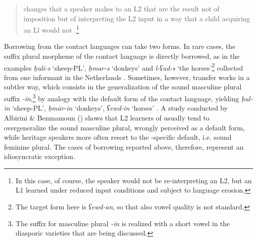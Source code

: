 \documentclass[output=paper]{langsci/langscibook}
\begin{document}
\begin{quote}changes that a speaker makes to an L2 that are the result not of {imposition} but of interpreting the L2 input in a way that a child acquiring an Ll would not \citep[525]{Lucas2015}.\footnote{In this case, of course, the speaker would not be re-interpreting an L2, but an L1 learned under reduced input conditions and subject to {language erosion}.}\end{quote}

Borrowing from the contact languages can take two forms. In rare cases, the suffix plural morpheme of the contact language is directly borrowed, as in the examples \textit{ḥuli-s} ‘sheep-PL’, \textit{ḥmar-s} ‘donkeys’ and \textit{l-ʕud-s} ‘the horses’\footnote{The target form here is \textit{ʕewd-an}, so that also vowel quality is not standard.} collected from one  informant in the Netherlands \citep[274]{BoumansdeRuiter2002}. Sometimes, however, {transfer} works in a subtler way, which consists in the generalization of the sound masculine plural suffix \textit{{}-īn},\footnote{The suffix for masculine plural \textit{-īn} is realized with a short vowel in the diasporic  varieties that are being discussed.} by {analogy} with the default form of the contact language, yielding \textit{ḥul-in} ‘sheep-PL’, \textit{ḥmār-in} ‘donkeys’, \textit{ʕewd-in} ‘horses’ \citep[274]{BoumansdeRuiter2002}. A study conducted by Albirini \& Benmamoun (\citeyear[866–867]{AlbiriniBenmamoun2014}) shows that L2 learners of  usually tend to overgeneralize the sound masculine plural, wrongly perceived as a default form, while {heritage speakers} more often resort to the -specific default, i.e. sound feminine plural. The cases of borrowing reported above, therefore, represent an idiosyncratic exception.
\end{document}
